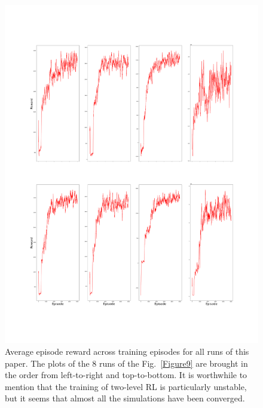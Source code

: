 \documentclass{article}
\begin{document}
\begin{figure}
	\centering
	\includegraphics[width=0.7\linewidth]{"A_Multi-agent_Reinforcement_Learning_Study_of_Emergence_of_Social_Classes_out_of_Arbitrary_Governance_The_Role_of_Environment_Plots/Average_Episode_Reward_across_Training"}
	\caption{Average episode reward across training  episodes \textendash for all runs of this paper. The plots of the 8 runs of the Fig.~\ref{Figure9} are brought in the order from left-to-right and top-to-bottom. It is worthwhile to mention that the training of two-level RL is particularly unstable, but it seems that almost all the simulations have been converged.}
	\label{Figure10}
\end{figure}
\end{document}
